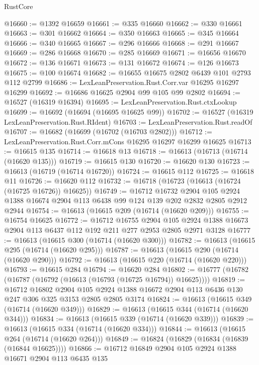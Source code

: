 \begin{lexlean}{RustCore}
\begin{coremodule}
@16660 := @1392 @16659
@16661 := @335 @16660
@16662 := @330 @16661
@16663 := @301 @16662
@16664 := @350 @16663
@16665 := @345 @16664
@16666 := @340 @16665
@16667 := @296 @16666
@16668 := @291 @16667
@16669 := @286 @16668
@16670 := @285 @16669
@16671 := @16656 @16670
@16672 := @136 @16671
@16673 := @131 @16672
@16674 := @126 @16673
@16675 := @100 @16674
@16682 := @16655 @16675 @2802 @6439 @101 @2793 @112 @2799
@16686 := LexLeanPreservation.Rust.Corr.var @16295 @16297 @16299
@16692 := @16686 @16625 @2904 @99 @105 @99 @2802
@16694 := @16527 (@16319 @16394)
@16695 := LexLeanPreservation.Rust.ctxLookup
@16699 := @16692 (@16694 (@16695 @16625 @99))
@16702 := @16527 (@16319 LexLeanPreservation.Rust.RIdent)
@16703 := LexLeanPreservation.Rust.readOf
@16707 := @16682 (@16699 (@16702 (@16703 @2802)))
@16712 := LexLeanPreservation.Rust.Corr.mCons @16295 @16297 @16299 @16625
@16713 := @16615 @135
@16714 := @16618 @13
@16718 := @16613 (@16713 (@16714 (@16620 @135)))
@16719 := @16615 @130
@16720 := @16620 @130
@16723 := @16613 (@16719 (@16714 @16720))
@16724 := @16615 @112
@16725 := @16618 @11
@16726 := @16620 @112
@16732 := @16718 (@16723 (@16613 (@16724 (@16725 @16726)) @16625))
@16749 := @16712
    @16732
    @2904
    @105
    @2924
    @1388
    @16674
    @2904
    @113
    @6438
    @99
    @124
    @139
    @202
    @2832
    @2805
    @2912
    @2944
@16754 := @16613 (@16615 @209 (@16714 (@16620 @209)))
@16755 := @16754 @16625
@16772 := @16712
    @16755
    @2904
    @105
    @2924
    @1388
    @16673
    @2904
    @113
    @6437
    @112
    @192
    @211
    @277
    @2953
    @2805
    @2971
    @3128
@16777 := @16613 (@16615 @300 (@16714 (@16620 @300)))
@16782 := @16613 (@16615 @295 (@16714 (@16620 @295)))
@16787 := @16613 (@16615 @290 (@16714 (@16620 @290)))
@16792 := @16613 (@16615 @220 (@16714 (@16620 @220)))
@16793 := @16615 @284
@16794 := @16620 @284
@16802 := @16777 (@16782 (@16787 (@16792 (@16613 (@16793 (@16725 @16794)) @16625))))
@16819 := @16712
    @16802
    @2904
    @105
    @2924
    @1388
    @16672
    @2904
    @113
    @6436
    @130
    @247
    @306
    @325
    @3153
    @2805
    @2805
    @3174
@16824 := @16613 (@16615 @349 (@16714 (@16620 @349)))
@16829 := @16613 (@16615 @344 (@16714 (@16620 @344)))
@16834 := @16613 (@16615 @339 (@16714 (@16620 @339)))
@16839 := @16613 (@16615 @334 (@16714 (@16620 @334)))
@16844 := @16613 (@16615 @264 (@16714 (@16620 @264)))
@16849 := @16824 (@16829 (@16834 (@16839 (@16844 @16625))))
@16866 := @16712
    @16849
    @2904
    @105
    @2924
    @1388
    @16671
    @2904
    @113
    @6435
    @135

\end{coremodule}
\end{lexlean}
